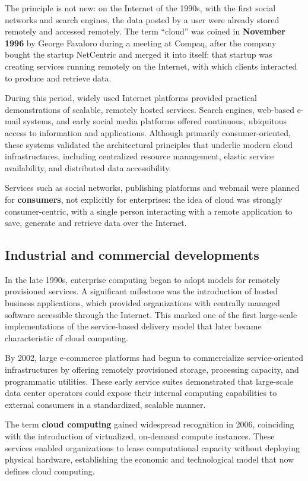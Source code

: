 \documentclass[11pt,a4paper,openany]{report}
\begin{document}
The principle is not new: on the Internet of the 1990s, with the first social networks and search engines, the data posted by a user were already stored remotely and accessed remotely. The term ``cloud'' was coined in \textbf{November 1996} by George Favaloro during a meeting at Compaq, after the company bought the startup NetCentric and merged it into itself: that startup was creating services running remotely on the Internet, with which clients interacted to produce and retrieve data.

During this period, widely used Internet platforms provided practical demonstrations of scalable, remotely hosted services. Search engines, web-based e-mail systems, and early social media platforms offered continuous, ubiquitous access to information and applications. Although primarily consumer-oriented, these systems validated the architectural principles that underlie modern cloud infrastructures, including centralized resource management, elastic service availability, and distributed data accessibility.

Services such as social networks, publishing platforms and webmail were planned for \textbf{consumers}, not explicitly for enterprises: the idea of cloud was strongly consumer-centric, with a single person interacting with a remote application to save, generate and retrieve data over the Internet.

\subsection{Industrial and commercial developments}

In the late 1990s, enterprise computing began to adopt models for remotely provisioned services. A significant milestone was the introduction of hosted business applications, which provided organizations with centrally managed software accessible through the Internet. This marked one of the first large-scale implementations of the service-based delivery model that later became characteristic of cloud computing.

By 2002, large e-commerce platforms had begun to commercialize service-oriented infrastructures by offering remotely provisioned storage, processing capacity, and programmatic utilities. These early service suites demonstrated that large-scale data center operators could expose their internal computing capabilities to external consumers in a standardized, scalable manner.

The term \textbf{cloud computing} gained widespread recognition in 2006, coinciding with the introduction of virtualized, on-demand compute instances. These services enabled organizations to lease computational capacity without deploying physical hardware, establishing the economic and technological model that now defines cloud computing.
\end{document}
